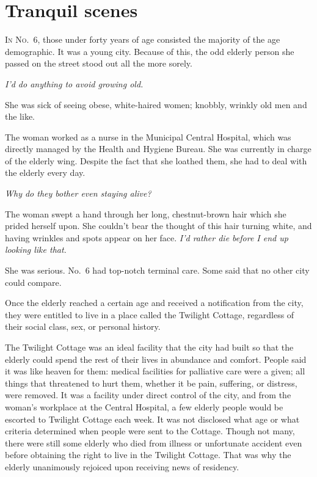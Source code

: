 
\chapter{Tranquil scenes}


\lettrine{I}{n No.~6}, those under forty years of age consisted the majority of the
age demographic. It was a young city. Because of this, the odd elderly
person she passed on the street stood out all the more sorely.

\emph{I'd do anything to avoid growing old.}

She was sick of seeing obese, white-haired women; knobbly, wrinkly old
men and the like.

The woman worked as a nurse in the Municipal Central Hospital, which was
directly managed by the Health and Hygiene Bureau. She was currently in
charge of the elderly wing. Despite the fact that she loathed them, she
had to deal with the elderly every day.

\emph{Why do they bother even staying alive?}

The woman swept a hand through her long, chestnut-brown hair which she
prided herself upon. She couldn't bear the thought of this hair turning
white, and having wrinkles and spots appear on her face. \emph{I'd rather die
before I end up looking like that.}

She was serious. No.~6 had top-notch terminal care. Some said that no
other city could compare.

Once the elderly reached a certain age and received a notification from
the city, they were entitled to live in a place called the Twilight
Cottage, regardless of their social class, sex, or personal history.

The Twilight Cottage was an ideal facility that the city had built so
that the elderly could spend the rest of their lives in abundance and
comfort. People said it was like heaven for them: medical facilities for
palliative care were a given; all things that threatened to hurt them,
whether it be pain, suffering, or distress, were removed. It was a
facility under direct control of the city, and from the woman's
workplace at the Central Hospital, a few elderly people would be
escorted to Twilight Cottage each week. It was not disclosed what age or
what criteria determined when people were sent to the Cottage. Though
not many, there were still some elderly who died from illness or
unfortunate accident even before obtaining the right to live in the
Twilight Cottage. That was why the elderly unanimously rejoiced upon
receiving news of residency.

